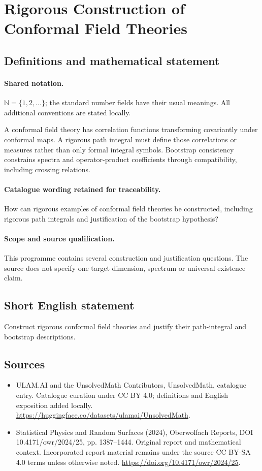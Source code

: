 \documentclass[11pt]{article}
\begin{document}
\section{Rigorous Construction of Conformal Field Theories}\label{statement}

\subsection{Definitions and mathematical statement}

\paragraph{Shared notation.}$\mathbb N=\{1,2,\ldots\}$; the standard number fields have their usual meanings. All additional conventions are stated locally.


A conformal field theory has correlation functions transforming covariantly under conformal maps. A rigorous path integral must define those correlations or measures rather than only formal integral symbols. Bootstrap consistency constrains spectra and operator-product coefficients through compatibility, including crossing relations.

\paragraph{Catalogue wording retained for traceability.}
How can rigorous examples of conformal field theories be constructed, including rigorous path integrals and justification of the bootstrap hypothesis?

\paragraph{Scope and source qualification.}This programme contains several construction and justification questions. The source does not specify one target dimension, spectrum or universal existence claim.
\subsection{Short English statement}
Construct rigorous conformal field theories and justify their path-integral and bootstrap descriptions.
\subsection{Sources}
\begin{itemize}
\item[\hypertarget{source:statement:1}{S1}] ULAM.AI and the UnsolvedMath Contributors, UnsolvedMath, catalogue entry. Catalogue curation under CC BY 4.0; definitions and English exposition added locally.
\url{https://huggingface.co/datasets/ulamai/UnsolvedMath}.
\item[\hypertarget{source:statement:2}{S2}] Statistical Physics and Random Surfaces (2024), Oberwolfach Reports, DOI 10.4171/owr/2024/25, pp. 1387--1444. Original report and mathematical context. Incorporated report material remains under the source CC BY-SA 4.0 terms unless otherwise noted.
\url{https://doi.org/10.4171/owr/2024/25}.
\end{itemize}
\label{end:statement}
\end{document}
